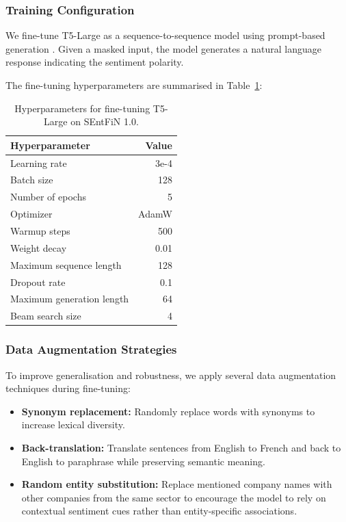\documentclass[12pt,a4paper]{article}
\begin{document}
\subsubsection{Training Configuration}
We fine-tune T5-Large as a sequence-to-sequence model using prompt-based generation \cite{aspect-sentiment-quad-prediction}. Given a masked input, the model generates a natural language response indicating the sentiment polarity.

The fine-tuning hyperparameters are summarised in Table~\ref{tab:finetune-hyperparams}:

\begin{table}[H]
\centering
\caption{Hyperparameters for fine-tuning T5-Large on SEntFiN 1.0.}
\label{tab:finetune-hyperparams}
\begin{tabular}{lr}
\toprule
\textbf{Hyperparameter} & \textbf{Value} \\
\midrule
Learning rate & 3e-4 \\
Batch size & 128 \\
Number of epochs & 5 \\
Optimizer & AdamW \\
Warmup steps & 500 \\
Weight decay & 0.01 \\
Maximum sequence length & 128 \\
Dropout rate & 0.1 \\
Maximum generation length & 64 \\
Beam search size & 4 \\
\bottomrule
\end{tabular}
\end{table}

\subsubsection{Data Augmentation Strategies}
To improve generalisation and robustness, we apply several data augmentation techniques during fine-tuning:
\begin{itemize}
    \item \textbf{Synonym replacement:} Randomly replace words with synonyms to increase lexical diversity.
    \item \textbf{Back-translation:} Translate sentences from English to French and back to English to paraphrase while preserving semantic meaning.
    \item \textbf{Random entity substitution:} Replace mentioned company names with other companies from the same sector to encourage the model to rely on contextual sentiment cues rather than entity-specific associations.
\end{itemize}
\end{document}
